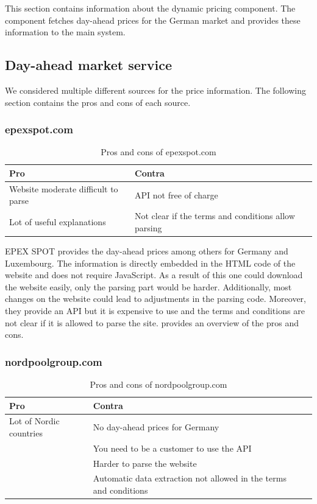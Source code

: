This section contains information about the dynamic pricing component.
The component fetches day-ahead prices for the German market and provides these
information to the main system.

\subsection{Day-ahead market service}

We considered multiple different sources for the price information. The following section contains the pros and cons of each source. 
\subsubsection{epexspot.com}
\FloatBarrier
\begin{table}[htbp]
	\centering
	\label{tab:epexspot}
	\begin{tabularx}{\textwidth}{ LLL }
		\toprule
		 Pro & Contra \\\midrule
		\tabitem Website moderate difficult to parse &\tabitem API not free of charge \cite{epexspot} \\
		 \tabitem Lot of useful explanations &\tabitem Not clear if the terms and conditions allow parsing \cite{epexspot}\\
		\bottomrule
	\end{tabularx}
	\caption{Pros and cons of epexspot.com}
\end{table}
\noindent EPEX SPOT provides the day-ahead prices among others for Germany and Luxembourg. The information is directly embedded in the HTML code of the website and does not require JavaScript. As a result of this one could download the website easily, only the parsing part would be harder. Additionally, most changes on the website could lead to adjustments in the parsing code. Moreover, they provide an API but it is expensive to use and the terms and conditions are not clear if it is allowed to parse the site.  provides an overview of the pros and cons.
\FloatBarrier

\subsubsection{nordpoolgroup.com}
\FloatBarrier
\begin{table}[htbp]
	\centering
	\begin{tabularx}{\textwidth}{ LLL }
		\toprule
		Pro & Contra \\\midrule
	     \tabitem Lot of Nordic countries & \tabitem No day-ahead prices for Germany \cite{nord}\\
		 &\tabitem You need to be a customer to use the API \cite{nord}\\
		  &\tabitem Harder to parse the website\\
		 &\tabitem Automatic data extraction not allowed in the terms and conditions \cite{nord2}\\ 
		\bottomrule
	\end{tabularx}
	\caption{Pros and cons of nordpoolgroup.com}
	\label{tab:nordpoolgroup}
\end{table}


